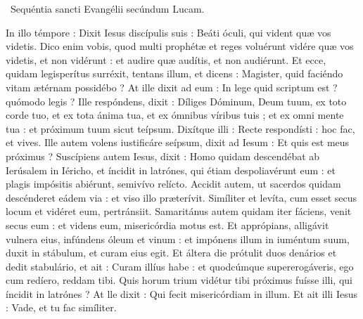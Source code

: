 \x~Sequéntia sancti Evangélii secúndum Lucam.

In illo témpore : Dixit Iesus discípulis suis : Beáti óculi, qui vident quæ vos videtis. Dico enim vobis, quod multi prophétæ et reges voluérunt vidére quæ vos videtis, et non vidérunt : et audire quæ audítis, et non audiérunt. Et ecce, quidam legisperítus surréxit, tentans illum, et dicens : Magister, quid faciéndo vitam ætérnam possidébo ? At ille dixit ad eum : In lege quid scriptum est ? quómodo legis ? Ille respóndens, dixit : Díliges Dóminum, Deum tuum, ex toto corde tuo, et ex tota ánima tua, et ex ómnibus víribus tuis ; et ex omni mente tua : et próximum tuum sicut teípsum. Dixítque illi : Recte respondísti : hoc fac, et vives. Ille autem volens iustificáre seípsum, dixit ad Iesum : Et quis est meus próximus ? Suscípiens autem Iesus, dixit : Homo quidam descendébat ab Ierúsalem in Iéricho, et íncidit in latrónes, qui étiam despoliavérunt eum : et plagis impósitis abiérunt, semivívo relícto. Accidit autem, ut sacerdos quidam descénderet eádem via : et viso illo præterívit. Simíliter et levíta, cum esset secus locum et vidéret eum, pertránsiit. Samaritánus autem quidam iter fáciens, venit secus eum : et videns eum, misericórdia motus est. Et apprópians, alligávit vulnera eius, infúndens óleum et vinum : et impónens illum in iuméntum suum, duxit in stábulum, et curam eius egit. Et áltera die prótulit duos denários et dedit stabulário, et ait : Curam illíus habe : et quodcúmque supererogáveris, ego cum redíero, reddam tibi. Quis horum trium vidétur tibi próximus fuísse illi, qui íncidit in latrónes ? At lle dixit : Qui fecit misericórdiam in illum. Et ait illi Iesus : Vade, et tu fac simíliter.
